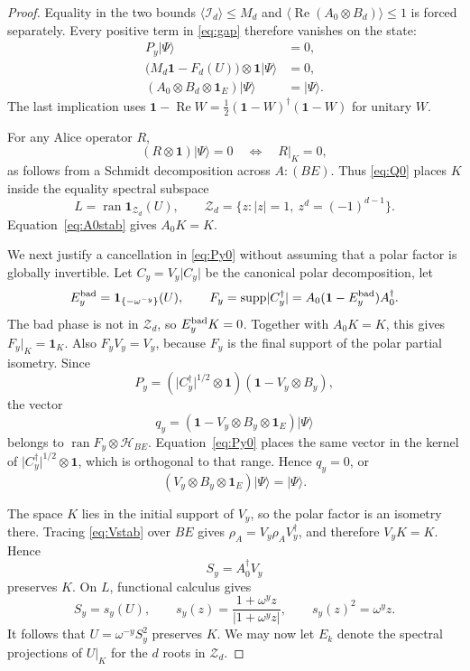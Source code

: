 \documentclass[11pt]{article}
\theoremstyle{remark}
\newcommand{\Id}{\mathbf 1}
\newcommand{\cI}{\mathcal I}
\newcommand{\cH}{\mathcal H}
\newcommand{\Reop}{\operatorname{Re}}
\newcommand{\supp}{\operatorname{supp}}
\newcommand{\absop}[1]{\lvert #1\rvert}
\begin{document}
\begin{proof}
Equality in the two bounds
\(\langle\cI_d\rangle\leq M_d\) and
\(\langle\Reop(A_0\otimes B_d)\rangle\leq1\) is forced separately.
Every positive term in \eqref{eq:gap} therefore vanishes on the state:
\begin{align}
  P_y\lvert\Psi\rangle&=0,\label{eq:Py0}\\
  \bigl(M_d\Id-F_d(U)\bigr)\otimes\Id\lvert\Psi\rangle&=0,\label{eq:Q0}\\
  (A_0\otimes B_d\otimes\Id_E)\lvert\Psi\rangle&=\lvert\Psi\rangle.
  \label{eq:A0stab}
\end{align}
The last implication uses
\(\Id-\Reop W=\frac12(\Id-W)^\dagger(\Id-W)\) for unitary \(W\).

For any Alice operator \(R\),
\begin{equation}
  (R\otimes\Id)\lvert\Psi\rangle=0
  \quad\Longleftrightarrow\quad R|_K=0,
  \label{eq:support}
\end{equation}
as follows from a Schmidt decomposition across \(A:(BE)\).
Thus \eqref{eq:Q0} places \(K\) inside the equality spectral subspace
\[
  L=\operatorname{ran}\mathbf1_{\mathcal Z_d}(U),
  \qquad
  \mathcal Z_d=\{z:\lvert z\rvert=1,\ z^d=(-1)^{d-1}\}.
\]
Equation~\eqref{eq:A0stab} gives \(A_0K=K\).

We next justify a cancellation in \eqref{eq:Py0} without assuming that a
polar factor is globally invertible.  Let \(C_y=V_y\absop{C_y}\) be the
canonical polar decomposition, let
\[
  E_y^{\rm bad}=\mathbf1_{\{-\omega^{-y}\}}(U),\qquad
  F_y=\supp\absop{C_y^\dagger}
  =A_0(\Id-E_y^{\rm bad})A_0^\dagger.
\]
The bad phase is not in \(\mathcal Z_d\), so \(E_y^{\rm bad}K=0\).
Together with \(A_0K=K\), this gives \(F_y|_K=\Id_K\).  Also
\(F_yV_y=V_y\), because \(F_y\) is the final support of the polar partial
isometry.  Since
\[
  P_y=
  (\absop{C_y^\dagger}^{1/2}\otimes\Id)
  (\Id-V_y\otimes B_y),
\]
the vector
\[
  q_y=(\Id-V_y\otimes B_y\otimes\Id_E)\lvert\Psi\rangle
\]
belongs to \(\operatorname{ran}F_y\otimes\cH_{BE}\).
Equation~\eqref{eq:Py0} places the same vector in the kernel of
\(\absop{C_y^\dagger}^{1/2}\otimes\Id\), which is orthogonal to that range.
Hence \(q_y=0\), or
\begin{equation}
  (V_y\otimes B_y\otimes\Id_E)\lvert\Psi\rangle=\lvert\Psi\rangle.
  \label{eq:Vstab}
\end{equation}

The space \(K\) lies in the initial support of \(V_y\), so the polar factor
is an isometry there.  Tracing \eqref{eq:Vstab} over \(BE\) gives
\(\rho_A=V_y\rho_AV_y^\dagger\), and therefore \(V_yK=K\).  Hence
\[
  S_y=A_0^\dagger V_y
\]
preserves \(K\).  On \(L\), functional calculus gives
\[
  S_y=s_y(U),\qquad
  s_y(z)=\frac{1+\omega^yz}{\lvert1+\omega^yz\rvert},
  \qquad s_y(z)^2=\omega^yz.
\]
It follows that \(U=\omega^{-y}S_y^2\) preserves \(K\).  We may now let
\(E_k\) denote the spectral projections of \(U|_K\) for the \(d\) roots in
\(\mathcal Z_d\).


\end{proof}
\end{document}
